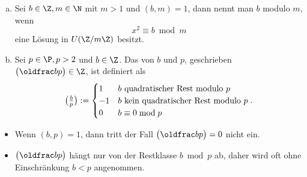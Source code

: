 \begin{df} \label{2.13}
	\begin{enumerate}[a)]
		\item
		Sei $b \in \Z, m \in \N$ mit $m > 1$ und $(b, m) = 1$, dann nennt man $b$  modulo $m$, wenn
		\[
			x^2 \equiv b \bmod m
		\]
		eine Lösung in $U(\Z / m\Z)$ besitzt.
		\item
			Sei $p \in \P, p > 2$ und $b \in \Z$.
			Das  von $b$ und $p$, geschrieben $\legsym bp \in \Z$, ist definiert als
			\[
				\legsym bp := \begin{cases}
					1 & \text{$b$ quadratischer Rest modulo $p$} \\
					-1 & \text{$b$ kein quadratischer Rest modulo $p$} \\
					0 & \text{$b \equiv 0 \bmod p$}
				\end{cases}.
			\]
	\end{enumerate}
	\begin{note}
		\begin{itemize}
			\item
				Wenn $(b, p) = 1$, dann tritt der Fall $\legsym bp = 0$ nicht ein.
			\item
				$\legsym bp$ hängt nur von der Restklasse $b \bmod p$ ab, daher wird oft ohne Einschränkung $b < p$ angenommen.
		\end{itemize}
	\end{note}
\end{df}


